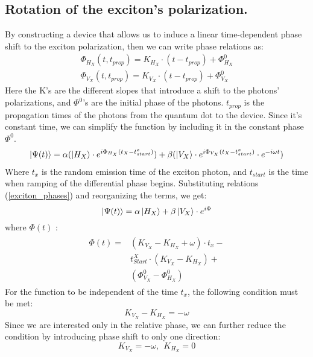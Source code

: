\subsection*{Rotation of the exciton's polarization.}
By constructing a device that allows us to induce a linear time-dependent phase shift to the exciton polarization, then we can write phase relations as:
\begin{equation} \label{exciton_phases}
	\begin{aligned} 
		&\Phi_{H_{X}}{(t,t_{prop})} = K_{H_{X}}\cdot(t-t_{prop}) + \Phi^0_{H_{X}} &\\
		&\Phi_{V_{X}}{(t,t_{prop})} = K_{V_{X}}\cdot(t-t_{prop}) + \Phi^0_{V_{X}} 
	\end{aligned}
\end{equation}
Here the  K's are the different slopes that introduce a shift to the photons' polarizations, and  $\Phi^0$'s are the initial phase of the photons. $t_{prop}$ is the propagation times of the photons from the quantum dot to the device. Since it's constant time, we can simplify the function by including it in the constant phase $\Phi^0$.
\begin{equation}
	\begin{split}
		\ket{\Psi(t)}= \alpha( \ket{H_{X}}\cdot e^{i\Phi_{H_{X}}(t_{X}-t^{x}_{start})})+
		\beta (\ket{V_{X}}\cdot e^{i\Phi_{V_{X}}(t_{X}-t^{x}_{start})}\cdot e^{-i\omega t})
	\end{split}
\end{equation} 
Where $t_x$ is the random emission time of the exciton photon, and $t_{start}$ is the time when ramping of the differential phase begins. Substituting relations (\ref{exciton_phases}) and reorganizing the terms, we get:
\begin{equation}
	\ket{\Psi(t)} = \alpha\ket{H_X}+\beta\ket{V_X}\cdot e^{i\Phi}
\end{equation}
where $\Phi(t)$ :
\begin{equation}
	\begin{split}  
		\begin{aligned} 
			\Phi(t) = &(K_{V_X}-K_{H_X} + \omega)\cdot t_x -\\
			&t^X_{Start} \cdot(K_{V_X}-K_{H_X})+\\
			&(\Phi^0_{V_{X}}-\Phi^0_{H_{X}})
		\end{aligned}
	\end{split}
\end{equation}
For the function to be independent of the time $t_x$, the following condition must be met:
\begin{equation}
	K_{V_X}-K_{H_X} =-\omega 
\end{equation}
Since we are interested only in the relative phase, we can further reduce the condition by introducing phase shift to only one direction:
\begin{equation}
	K_{V_X} =-\omega ,~~ K_{H_X} =0
\end{equation}
